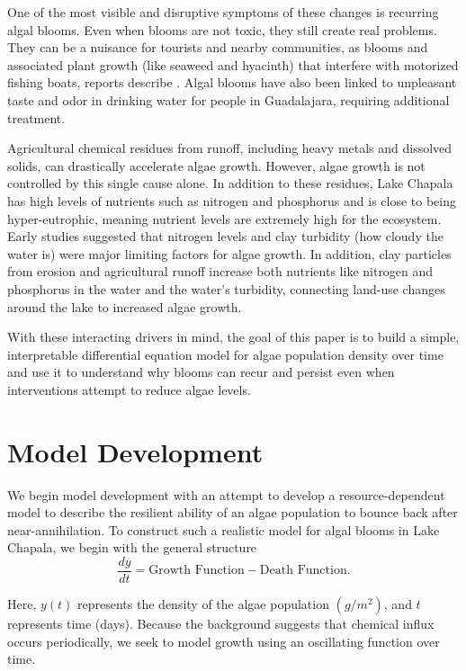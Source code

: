 \documentclass[11pt]{article}
\begin{document}
One of the most visible and disruptive symptoms of these changes is recurring algal blooms. Even when blooms are not toxic, they still create real problems. They can be a nuisance for tourists and nearby communities, as blooms and associated plant growth (like seaweed and hyacinth) that interfere with motorized fishing boats, reports describe \cite{harwood-algae}. Algal blooms have also been linked to unpleasant taste and odor in drinking water for people in Guadalajara, requiring additional treatment.

Agricultural chemical residues from runoff, including heavy metals and dissolved solids, can drastically accelerate algae growth. However, algae growth is not controlled by this single cause alone. In addition to these residues, Lake Chapala has high levels of nutrients such as nitrogen and phosphorus and is close to being hyper-eutrophic, meaning nutrient levels are extremely high for the ecosystem. Early studies suggested that nitrogen levels and clay turbidity (how cloudy the water is) were major limiting factors for algae growth. In addition, clay particles from erosion and agricultural runoff increase both nutrients like nitrogen and phosphorus in the water and the water's turbidity, connecting land-use changes around the lake to increased algae growth.

With these interacting drivers in mind, the goal of this paper is to build a simple, interpretable differential equation model for algae population density over time and use it to understand why blooms can recur and persist even when interventions attempt to reduce algae levels.

\section{Model Development}

We begin model development with an attempt to develop a resource-dependent model to describe the resilient ability of an algae population to bounce back after near-annihilation. To construct such a realistic model for algal blooms in Lake Chapala, we begin with the general structure
\begin{equation}
    \frac{dy}{dt} = \text{Growth Function} - \text{Death Function}.
\end{equation}

Here, $y(t)$ represents the density of the algae population $(g/m^2)$, and $t$ represents time (days). Because the background suggests that chemical influx occurs periodically, we seek to model growth using an oscillating function over time.
\end{document}
